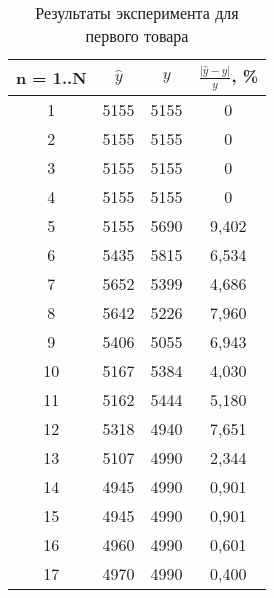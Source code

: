\documentclass{bmstu}
\begin{document}
\begin{table}[H]
	\caption{Результаты эксперимента для первого товара}
	\begin{center}
		\begin{tabular}{| c | c | c | c |} 
			\hline
			
			\textbf{n = 1..N} & \textbf{$\hat{y}$} & \textbf{$y$} & \textbf{$\frac{|\hat{y} - y|}{y}$, \%} \\  
			
			\hline
			1 & 5155 & 5155 & 0\\
			\hline
			2 & 5155 & 5155 & 0\\
			\hline
			3 & 5155 & 5155 & 0\\
			\hline
			4 & 5155 & 5155 & 0\\
			\hline
			5 & 5155 & 5690 & 9,402\\
			\hline
			6 & 5435 & 5815 & 6,534\\
			\hline
			7 & 5652 & 5399 & 4,686\\
			\hline
			8 & 5642 & 5226 & 7,960\\
			\hline
			9 & 5406 & 5055 & 6,943\\
			\hline
			10 & 5167 & 5384 & 4,030\\
			\hline
			11 & 5162 & 5444 & 5,180\\
			\hline
			12 & 5318 & 4940 & 7,651\\
			\hline
			13 & 5107 & 4990 & 2,344\\
			\hline
			14 & 4945 & 4990 & 0,901\\
			\hline
			15 & 4945 & 4990 & 0,901\\
			\hline
			16 & 4960 & 4990 & 0,601\\
			\hline
			17 & 4970 & 4990 & 0,400\\
			\hline
		\end{tabular}
	\end{center}
\end{table}
\end{document}
